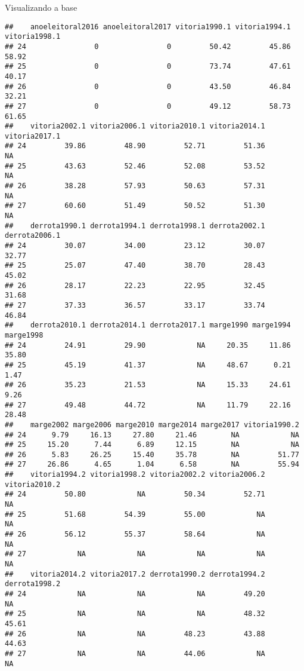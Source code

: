 \documentclass[
  10pt,
  ignorenonframetext,
]{beamer}
\begin{document}
\begin{frame}[fragile]{Visualizando a base}
\begin{verbatim}
##    anoeleitoral2016 anoeleitoral2017 vitoria1990.1 vitoria1994.1 vitoria1998.1
## 24                0                0         50.42         45.86         58.92
## 25                0                0         73.74         47.61         40.17
## 26                0                0         43.50         46.84         32.21
## 27                0                0         49.12         58.73         61.65
##    vitoria2002.1 vitoria2006.1 vitoria2010.1 vitoria2014.1 vitoria2017.1
## 24         39.86         48.90         52.71         51.36            NA
## 25         43.63         52.46         52.08         53.52            NA
## 26         38.28         57.93         50.63         57.31            NA
## 27         60.60         51.49         50.52         51.30            NA
##    derrota1990.1 derrota1994.1 derrota1998.1 derrota2002.1 derrota2006.1
## 24         30.07         34.00         23.12         30.07         32.77
## 25         25.07         47.40         38.70         28.43         45.02
## 26         28.17         22.23         22.95         32.45         31.68
## 27         37.33         36.57         33.17         33.74         46.84
##    derrota2010.1 derrota2014.1 derrota2017.1 marge1990 marge1994 marge1998
## 24         24.91         29.90            NA     20.35     11.86     35.80
## 25         45.19         41.37            NA     48.67      0.21      1.47
## 26         35.23         21.53            NA     15.33     24.61      9.26
## 27         49.48         44.72            NA     11.79     22.16     28.48
##    marge2002 marge2006 marge2010 marge2014 marge2017 vitoria1990.2
## 24      9.79     16.13     27.80     21.46        NA            NA
## 25     15.20      7.44      6.89     12.15        NA            NA
## 26      5.83     26.25     15.40     35.78        NA         51.77
## 27     26.86      4.65      1.04      6.58        NA         55.94
##    vitoria1994.2 vitoria1998.2 vitoria2002.2 vitoria2006.2 vitoria2010.2
## 24         50.80            NA         50.34         52.71            NA
## 25         51.68         54.39         55.00            NA            NA
## 26         56.12         55.37         58.64            NA            NA
## 27            NA            NA            NA            NA            NA
##    vitoria2014.2 vitoria2017.2 derrota1990.2 derrota1994.2 derrota1998.2
## 24            NA            NA            NA         49.20            NA
## 25            NA            NA            NA         48.32         45.61
## 26            NA            NA         48.23         43.88         44.63
## 27            NA            NA         44.06            NA            NA

\end{verbatim}
\end{frame}
\end{document}
